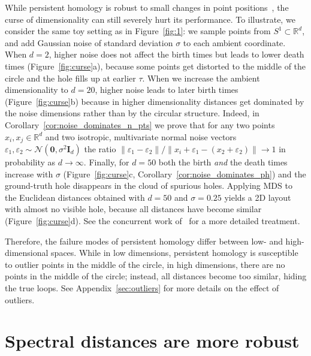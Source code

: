 \documentclass{article}
\theoremstyle{plain}
\theoremstyle{definition}
\theoremstyle{remark}
\begin{document}
While persistent homology is robust to small changes in point positions~\citep{cohen2005stability}, the curse of dimensionality can still severely hurt its performance. To illustrate, we consider the same toy setting as in Figure~\ref{fig:1}: we sample points from $S^1 \subset \mathbb R^d$, and add Gaussian noise of standard deviation $\sigma$ to each ambient coordinate. When $d=2$, higher noise does not affect the birth times but leads to lower death times (Figure~\ref{fig:curse}a), because some points get distorted to the middle of the circle and the hole fills up at earlier $\tau$. When we increase the ambient dimensionality to $d=20$, higher noise leads to later birth times (Figure~\ref{fig:curse}b) because in higher dimensionality distances get dominated by the noise dimensions rather than by the circular structure. Indeed, in Corollary~\ref{cor:noise_dominates_n_pts} we prove that for any two points $x_i, x_j\in \mathbb{R}^d$ and two isotropic, multivariate normal noise vectors $\varepsilon_1, \varepsilon_2\sim\mathcal{N}(\mathbf{0}, \sigma^2\mathbf{I}_d)$ the ratio $\|\varepsilon_1 - \varepsilon_2\| / \|x_i+ \varepsilon_1 - (x_2 +\varepsilon_2)\| \to 1$ in probability as $d\to \infty$. Finally, for $d=50$ both the birth \textit{and} the death times increase with $\sigma$ (Figure~\ref{fig:curse}c, Corollary~\ref{cor:noise_dominates_ph}) and the ground-truth hole disappears in the cloud of spurious holes. Applying MDS to the Euclidean distances obtained with $d=50$ and $\sigma=0.25$ yields a 2D layout with almost no visible hole, because all distances have become similar (Figure~\ref{fig:curse}d). 
See the concurrent work of~\citet{hiraoka2024curse} for a more detailed treatment.

Therefore, the failure modes of persistent homology differ between low- and  high-dimensional spaces. While in low dimensions, persistent homology is susceptible to outlier points in the middle of the circle, in high dimensions, there are no points in the middle of the circle; instead, all distances become too similar, hiding the true loops. See Appendix~\ref{sec:outliers} for more details on the effect of outliers.


\section{Spectral distances are more robust}
\label{sec:background-spectral}
\end{document}
